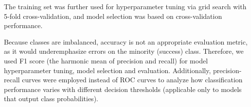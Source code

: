 The training set was further used for hyperparameter tuning via 
grid search with 5-fold cross-validation, and model selection was based 
on cross-validation performance. 

Because classes are imbalanced, accuracy is not an appropriate evaluation metric, as it would
 underemphasize errors on the minority (success) class. Therefore, we used F1 score
(the harmonic mean of precision and recall) for model hyperparameter tuning, model selection and evaluation. 
Additionally, precision-recall curves were employed instead of ROC curves to analyze how classification
performance varies with different decision thresholds (applicable only to models that output class probabilities).


